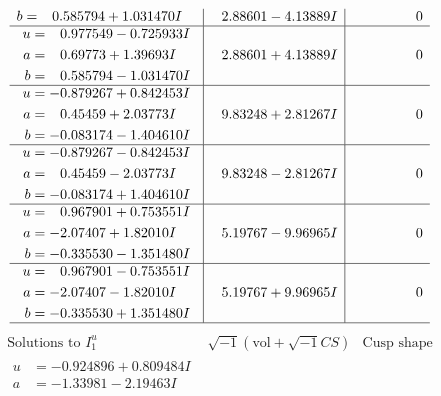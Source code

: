 \documentclass[1p]{elsarticle_modified}
\theoremstyle{definition}
\newcommand{\I}{\sqrt{-1}}
\begin{document}
$$\begin{array}{c|c|c}
\begin{aligned}
b &= \phantom{-}0.585794 + 1.031470 I\end{aligned}
 & \phantom{-}2.88601 - 4.13889 I & \phantom{-0.000000 } 0 \\ \hline\begin{aligned}
u &= \phantom{-}0.977549 - 0.725933 I \\
a &= \phantom{-}0.69773 + 1.39693 I \\
b &= \phantom{-}0.585794 - 1.031470 I\end{aligned}
 & \phantom{-}2.88601 + 4.13889 I & \phantom{-0.000000 } 0 \\ \hline\begin{aligned}
u &= -0.879267 + 0.842453 I \\
a &= \phantom{-}0.45459 + 2.03773 I \\
b &= -0.083174 - 1.404610 I\end{aligned}
 & \phantom{-}9.83248 + 2.81267 I & \phantom{-0.000000 } 0 \\ \hline\begin{aligned}
u &= -0.879267 - 0.842453 I \\
a &= \phantom{-}0.45459 - 2.03773 I \\
b &= -0.083174 + 1.404610 I\end{aligned}
 & \phantom{-}9.83248 - 2.81267 I & \phantom{-0.000000 } 0 \\ \hline\begin{aligned}
u &= \phantom{-}0.967901 + 0.753551 I \\
a &= -2.07407 + 1.82010 I \\
b &= -0.335530 - 1.351480 I\end{aligned}
 & \phantom{-}5.19767 - 9.96965 I & \phantom{-0.000000 } 0 \\ \hline\begin{aligned}
u &= \phantom{-}0.967901 - 0.753551 I \\
a &= -2.07407 - 1.82010 I \\
b &= -0.335530 + 1.351480 I\end{aligned}
 & \phantom{-}5.19767 + 9.96965 I & \phantom{-0.000000 } 0\\
 \hline 
 \end{array}$$\newpage$$\begin{array}{c|c|c}  
\text{Solutions to }I^u_{1}& \I (\text{vol} + \sqrt{-1}CS) & \text{Cusp shape}\\
 \hline 
\begin{aligned}
u &= -0.924896 + 0.809484 I \\
a &= -1.33981 - 2.19463 I \\

\end{aligned}
\end{array}$$
\end{document}
